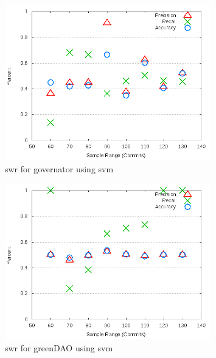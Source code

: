 \begin{figure}[!t]
\centering
\includegraphics[width=0.8\textwidth]{images/svm/test_1/governator_sample_range.png}
\caption{\gls{swr} for governator using \gls{svm}}
\label{fig:test_1_governator_svm}
\end{figure}

\begin{figure}[!t]
\centering
\includegraphics[width=0.8\textwidth]{images/svm/test_1/greenDAO_sample_range.png}
\caption{\gls{swr} for greenDAO using \gls{svm}}
\label{fig:test_1_greenDAO_svm}
\end{figure}

